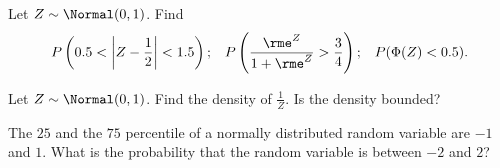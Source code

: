 \begin{problem}[Handout 13, \# 20]
  Let \(Z\sim\Normal(0,1)\). Find
  \[
    \begin{aligned}
      P\left( 0.5<\left|Z-\frac{1}{2}\right|<1.5\right);
      && P\left(\frac{\rme^Z}{1+\rme^Z}>\frac{3}{4}\right);
      &&P(\Phi(Z)<0.5).
    \end{aligned}
  \]
\end{problem}
\begin{solution}

\end{solution}
\newpage

\begin{problem}[Handout 13, \# 21]
  Let \(Z\sim\Normal(0,1)\). Find the density of \(\frac{1}{Z}\). Is the
  density bounded?
\end{problem}
\begin{solution}

\end{solution}
\newpage

\begin{problem}[Handout 13, \# 22]
  The \(25\) and the \(75\) percentile of a
  normally distributed random variable are \(-1\) and \(1\). What is the
  probability that the random variable is between \(-2\) and \(2\)?
\end{problem}
\begin{solution}

\end{solution}

